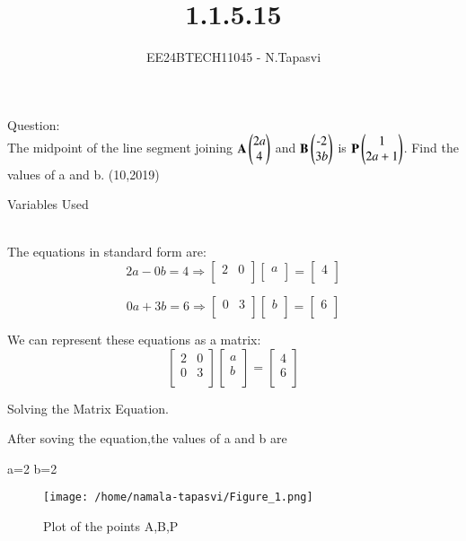 \documentclass[journal]{IEEEtran}
\begin{document}

\vspace{3cm}

\title{1.1.5.15}
\author{EE24BTECH11045 - N.Tapasvi}
{\let\newpage\relax\maketitle}
Question:\\
The midpoint of the line segment joining $\mathbf{A}\begin{pmatrix}2a\\4\end{pmatrix}$ and $\mathbf{B}\begin{pmatrix}\text{-}2\\3b\end{pmatrix}$ is $\mathbf{P}\begin{pmatrix}1\\2a+1\end{pmatrix}$. Find the values of a and b.
\hfill (10,2019)
\\
\solution
\begin{table}[h!]    
  \centering
  
  \caption{Variables Used}
  \label{tab1-1.9-6}
\end{table}\\
The equations in standard form are:
\[
2a - 0b = 4 \Rightarrow
\begin{bmatrix}
2 & 0 \\
\end{bmatrix}
\begin{bmatrix}
a \\
\end{bmatrix}
=
\begin{bmatrix}
4 \\
\end{bmatrix}
\]

\[
0a + 3b = 6 \Rightarrow
\begin{bmatrix}
0 & 3 \\
\end{bmatrix}
\begin{bmatrix}
b \\
\end{bmatrix}
=
\begin{bmatrix}
6 \\
\end{bmatrix}
\]

We can represent these equations as a matrix:
\[
\begin{bmatrix}
2 & 0 \\
0 & 3 \\
\end{bmatrix}
\begin{bmatrix}
a \\
b \\
\end{bmatrix}
=
\begin{bmatrix}
4 \\
6 \\
\end{bmatrix}
\]

Solving the Matrix Equation.

After soving the equation,the values of a and b are

a=2
b=2
\begin{figure}[h!]
   \centering
   \texttt{[image: /home/namala-tapasvi/Figure\_1.png]}
   \caption{Plot of the points A,B,P}
   \label{stemplot}
\end{figure}
\end{document}
